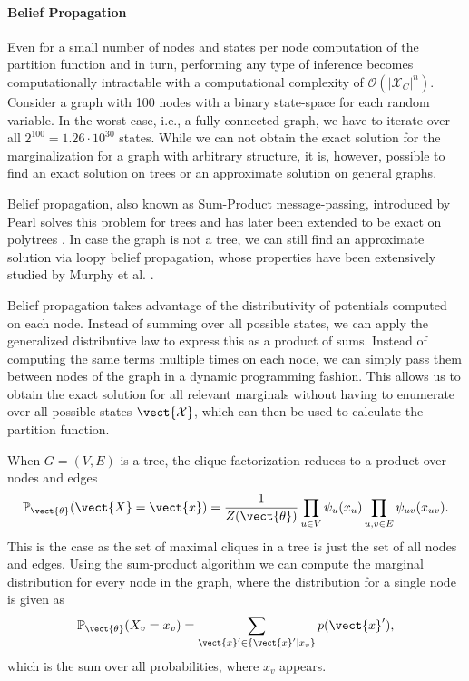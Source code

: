 \paragraph*{Belief Propagation}
Even for a small number of nodes and states per node computation of the partition function and in turn, performing any type of inference becomes computationally intractable with a computational complexity of $\mathcal{O}(\lvert \mathcal{X}_C \rvert^n)$.
Consider a graph with 100 nodes with a binary state-space for each random variable.
In the worst case, i.e., a fully connected graph, we have to iterate over all $2^{100} = 1.26\cdot 10^{30}$ states.
While we can not obtain the exact solution for the marginalization for a graph with arbitrary structure, it is, however, possible to find an exact solution on trees or an approximate solution on general graphs.


Belief propagation, also known as Sum-Product message-passing, introduced by Pearl \cite{pearl1982reverend} solves this problem for trees and has later been extended to be exact on polytrees \cite{kim1983computational}.
In case the graph is not a tree, we can still find an approximate solution via loopy belief propagation, whose properties have been extensively studied by Murphy et al. \cite{murphy2013loopy}.

Belief propagation takes advantage of the distributivity of potentials computed on each node.
Instead of summing over all possible states, we can apply the generalized distributive law to express this as a product of sums.
Instead of computing the same terms multiple times on each node, we can simply pass them between nodes of the graph in a dynamic programming fashion.
This allows us to obtain the exact solution for all relevant marginals without having to enumerate over all possible states $\vect{\mathcal{X}}$, which can then be used to calculate the partition function.

When $G=(V,E)$ is a tree, the clique factorization reduces to a product over nodes and edges
\begin{equation}
    \label{eq:edgepot}
    \mathbb{P}_{\vect{\theta}}(\vect{X} = \vect{x}) = \frac{1}{Z(\vect{\theta})} \prod_{u\in V} \psi_u(x_u) \prod_{u,v \in E} \psi_{uv}(x_{uv}).
\end{equation}
This is the case as the set of maximal cliques in a tree is just the set of all nodes and edges.
Using the sum-product algorithm we can compute the marginal distribution for every node in the graph, where the distribution for a single node is given as
\begin{equation}
    \mathbb{P}_{\vect{\theta}}(X_v = x_v) = \sum_{\vect{x}' \in \{\vect{x}' \lvert x_v\}} p(\vect{x}'),
\end{equation}
which is the sum over all probabilities, where $x_v$ appears.

